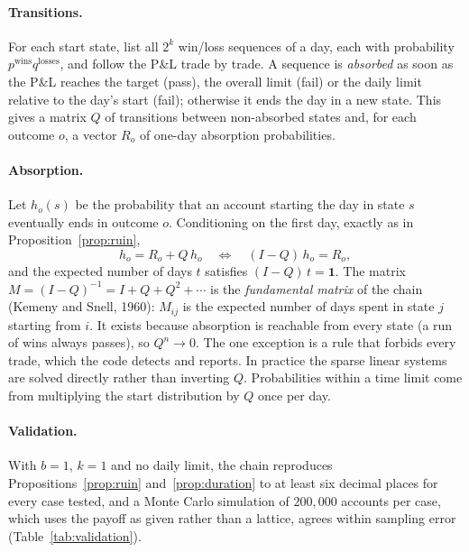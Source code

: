 \documentclass[11pt,a4paper]{article}
\begin{document}
\paragraph{Transitions.} For each start state, list all $2^k$ win/loss sequences of a
day, each with probability $p^{\text{wins}} q^{\text{losses}}$, and follow the P\&L trade
by trade. A sequence is \emph{absorbed} as soon as the P\&L reaches the target (pass),
the overall limit (fail) or the daily limit relative to the day's start (fail);
otherwise it ends the day in a new state. This gives a matrix $Q$ of transitions between
non-absorbed states and, for each outcome $o$, a vector $R_o$ of one-day absorption
probabilities.

\paragraph{Absorption.} Let $h_o(s)$ be the probability that an account starting the day
in state $s$ eventually ends in outcome $o$. Conditioning on the first day, exactly as in
Proposition~\ref{prop:ruin},
\[
  h_o = R_o + Q\,h_o \quad\Longleftrightarrow\quad (I - Q)\,h_o = R_o,
\]
and the expected number of days $t$ satisfies $(I-Q)\,t = \mathbf{1}$. The matrix
$M = (I-Q)^{-1} = I + Q + Q^2 + \cdots$ is the \emph{fundamental matrix} of the chain
(Kemeny and Snell, 1960): $M_{ij}$ is the expected number of days spent in state $j$
starting from $i$. It exists because absorption is reachable from every state (a run of
wins always passes), so $Q^n \to 0$. The one exception is a rule that forbids every
trade, which the code detects and reports. In practice the sparse
linear systems are solved directly rather than inverting $Q$. Probabilities within a
time limit come from multiplying the start distribution by $Q$ once per day.

\paragraph{Validation.} With $b = 1$, $k = 1$ and no daily limit, the chain reproduces
Propositions~\ref{prop:ruin} and~\ref{prop:duration} to at least six decimal places for
every case tested, and a Monte Carlo simulation of $200{,}000$ accounts per case, which
uses the payoff as given rather than a lattice, agrees within sampling error
(Table~\ref{tab:validation}).
\end{document}
